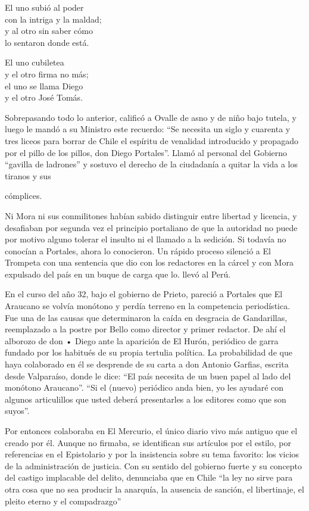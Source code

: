 \documentclass[10pt,twoside,openright]{memoir}
\begin{document}
El uno subió al poder\\
con la intriga y la maldad;\\
y al otro sin saber cómo\\
lo sentaron donde está.

El uno cubiletea\\
y el otro firma no más;\\
el uno se llama Diego\\
y el otro José Tomás.

Sobrepasando todo lo anterior, calificó a Ovalle de asno y de niño bajo
tutela, y luego le mandó a su Ministro este recuerdo: ``Se necesita un
siglo y cuarenta y tres liceos para borrar de Chile el espíritu de
venalidad introducido y propagado por el pillo de los
pillos, don Diego Portales''. Llamó
al personal del Gobierno ``gavilla de ladrones'' y sostuvo el derecho de
la ciudadanía a quitar la vida a los tiranos y sus

cómplices.

Ni Mora ni sus conmilitones habían sabido distinguir entre libertad y
licencia, y desafiaban por segunda vez el principio portaliano de que la
autoridad no puede por motivo alguno tolerar el insulto ni el llamado a
la sedición. Si todavía no conocían a Portales, ahora lo conocieron. Un
rápido proceso silenció a El Trompeta con una sentencia que dio con los
redactores en la cárcel y con Mora expulsado del país en un buque de
carga que lo. llevó al Perú.

En el curso del año 32, bajo el
gobierno de Prieto, pareció a Portales que El Araucano se volvía
monótono y perdía terreno en la competencia periodística. Fue una de las
causas que determinaron la caída en desgracia de Gandarillas,
reemplazado a la postre por Bello como director y primer redactor. De
ahí el alborozo de don • Diego ante la aparición de El Hurón, periódico
de garra fundado por los habitués de su propia tertulia política. La
probabilidad de que haya colaborado en él se desprende de su carta a don
Antonio Garfias, escrita desde Valparaíso, donde le dice: ``El país
necesita de un buen papel al lado del monótono Araucano''. ``Si el (nuevo)
periódico anda bien, yo les ayudaré con algunos articulillos que usted
deberá presentarles a los editores como que son suyos''.

Por entonces colaboraba en El Mercurio, el único diario vivo más antiguo
que el creado por él. Aunque no firmaba, se identifican sus artículos
por el estilo, por referencias en el Epistolario y por la insistencia
sobre su tema favorito: los vicios de la administración de justicia. Con
su sentido del gobierno fuerte y su concepto del castigo implacable del
delito, denunciaba que en Chile ``la ley no sirve para otra cosa que no
sea producir la anarquía, la ausencia de sanción, el libertinaje, el
pleito eterno y el compadrazgo''
\end{document}
